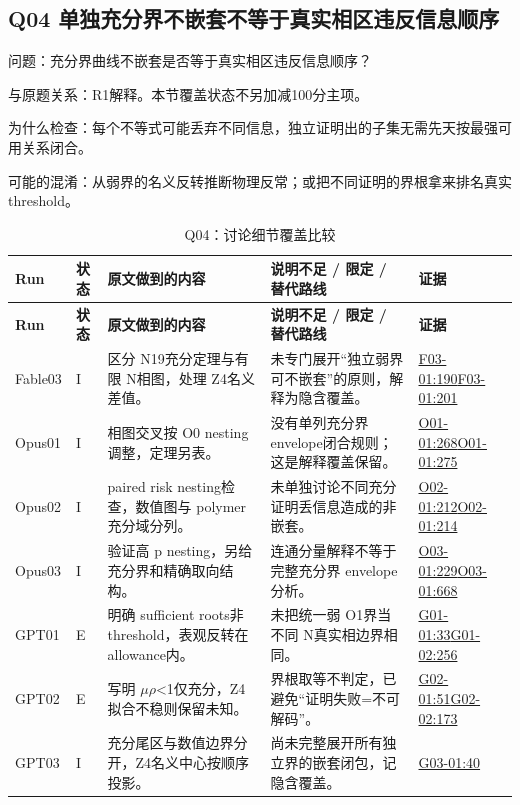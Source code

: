 \documentclass[11pt,a4paper]{article}
\begin{document}
\clearpage
\subsection{Q04 单独充分界不嵌套不等于真实相区违反信息顺序}
\label{aspect:Q04}
问题：充分界曲线不嵌套是否等于真实相区违反信息顺序？

与原题关系：R1解释。本节覆盖状态不另加减100分主项。

为什么检查：每个不等式可能丢弃不同信息，独立证明出的子集无需先天按最强可用关系闭合。

可能的混淆：从弱界的名义反转推断物理反常；或把不同证明的界根拿来排名真实 threshold。

{\fontsize{9.0}{12.6}\selectfont
\setlength{\tabcolsep}{2.5pt}
\begin{longtable}{>{\raggedright\arraybackslash}p{}>{\raggedright\arraybackslash}p{}>{\raggedright\arraybackslash}p{}>{\raggedright\arraybackslash}p{}>{\raggedright\arraybackslash}p{}}
\caption{Q04：讨论细节覆盖比较}\\
\toprule
\textbf{Run} & \textbf{状态} & \textbf{原文做到的内容} & \textbf{说明不足 / 限定 / 替代路线} & \textbf{证据}\tabularnewline
\midrule
\endfirsthead
\toprule
\textbf{Run} & \textbf{状态} & \textbf{原文做到的内容} & \textbf{说明不足 / 限定 / 替代路线} & \textbf{证据}\tabularnewline
\midrule
\endhead
{}Fable03 & I & 区分 N19充分定理与有限 N相图，处理 Z4名义差值。 & 未专门展开“独立弱界可不嵌套”的原则，解释为隐含覆盖。 & \hyperref[src:F03-01]{F03-01:190}\newline \hyperref[src:F03-01]{F03-01:201}\tabularnewline
{}Opus01 & I & 相图交叉按 O0 nesting调整，定理另表。 & 没有单列充分界 envelope闭合规则；这是解释覆盖保留。 & \hyperref[src:O01-01]{O01-01:268}\newline \hyperref[src:O01-01]{O01-01:275}\tabularnewline
{}Opus02 & I & paired risk nesting检查，数值图与 polymer充分域分列。 & 未单独讨论不同充分证明丢信息造成的非嵌套。 & \hyperref[src:O02-01]{O02-01:212}\newline \hyperref[src:O02-01]{O02-01:214}\tabularnewline
{}Opus03 & I & 验证高 p nesting，另给充分界和精确取向结构。 & 连通分量解释不等于完整充分界 envelope分析。 & \hyperref[src:O03-01]{O03-01:229}\newline \hyperref[src:O03-01]{O03-01:668}\tabularnewline
{}GPT01 & E & 明确 sufficient roots非threshold，表观反转在 allowance内。 & 未把统一弱 O1界当不同 N真实相边界相同。 & \hyperref[src:G01-01]{G01-01:33}\newline \hyperref[src:G01-02]{G01-02:256}\tabularnewline
{}GPT02 & E & 写明 \ensuremath{\mu}\ensuremath{\rho}<1仅充分，Z4拟合不稳则保留未知。 & 界根取等不判定，已避免“证明失败=不可解码”。 & \hyperref[src:G02-01]{G02-01:51}\newline \hyperref[src:G02-02]{G02-02:173}\tabularnewline
{}GPT03 & I & 充分尾区与数值边界分开，Z4名义中心按顺序投影。 & 尚未完整展开所有独立界的嵌套闭包，记隐含覆盖。 & \hyperref[src:G03-01]{G03-01:40}\tabularnewline
\bottomrule
\end{longtable}
}
\end{document}
